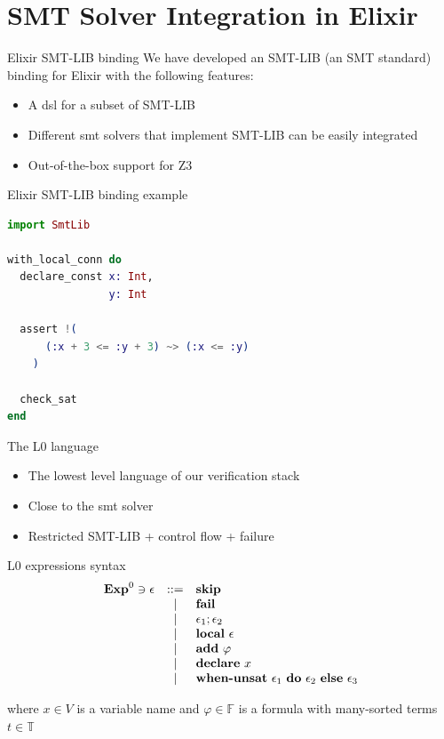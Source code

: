 \documentclass{beamer}
\begin{document}
  \section{SMT Solver Integration in Elixir}
  \begin{frame}{Elixir SMT-LIB binding}
    We have developed an SMT-LIB (an SMT standard) binding for Elixir with the following features:

    \begin{itemize}
      \item \pause A \gls*{dsl} for a subset of SMT-LIB
      \item \pause Different \acrshort*{smt} solvers that implement SMT-LIB can be easily integrated
      \item \pause Out-of-the-box support for Z3
    \end{itemize}
  \end{frame}
  \begin{frame}[fragile]{Elixir SMT-LIB binding example}
    \small
    \begin{lstlisting}[language=elixir,numbers=none,frame=none]
import SmtLib

with_local_conn do
  declare_const x: Int,
                y: Int

  assert !(
      (:x + 3 <= :y + 3) ~> (:x <= :y)
    )

  check_sat
end
      \end{lstlisting}
  \end{frame}
  \begin{frame}{The L0 language}
    \begin{itemize}
      \item \pause The lowest level language of our verification stack
      \item \pause Close to the \acrshort*{smt} solver
      \item \pause Restricted SMT-LIB + control flow + failure
    \end{itemize}
  \end{frame}
  \begin{frame}{L0 expressions syntax}
    \[
      \begin{array}{rcll}
        \mathbf{Exp}^{0} \ni \epsilon & ::= & \textbf{skip} \\
        & | & \textbf{fail} \\
        & | & \epsilon_1;\epsilon_2 \\
        & | & \textbf{local}~\epsilon \\
        & | & \textbf{add}~\varphi \\
        & | & \textbf{declare}~x \\
        & | & \textbf{when-unsat}~\epsilon_1~\textbf{do}~\epsilon_2~\textbf{else}~\epsilon_3 \\
      \end{array}
    \]

    \pause where $x \in V$ is a variable name and $\varphi \in \mathbb{F}$ is a 
    formula with many-sorted terms $t \in \mathbb{T}$
  \end{frame}
\end{document}

